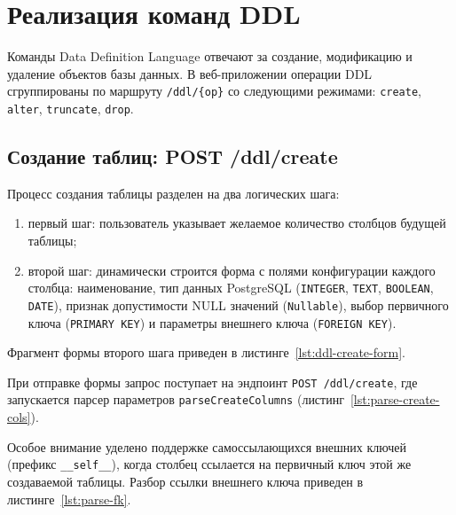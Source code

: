 \section{Реализация команд DDL}
\label{sec:ddl}

Команды Data Definition Language отвечают за создание, модификацию и удаление объектов базы данных. В веб-приложении операции DDL сгруппированы по маршруту \texttt{/ddl/\{op\}} со следующими режимами: \texttt{create}, \texttt{alter}, \texttt{truncate}, \texttt{drop}.

\subsection{Создание таблиц: POST /ddl/create}

Процесс создания таблицы разделен на два логических шага:
\begin{enumerate}
    \item первый шаг: пользователь указывает желаемое количество столбцов будущей таблицы;
    \item второй шаг: динамически строится форма с полями конфигурации каждого столбца: наименование, тип данных PostgreSQL (\texttt{INTEGER}, \texttt{TEXT}, \texttt{BOOLEAN}, \texttt{DATE}), признак допустимости NULL значений (\texttt{Nullable}), выбор первичного ключа (\texttt{PRIMARY KEY}) и параметры внешнего ключа (\texttt{FOREIGN KEY}).
\end{enumerate}

Фрагмент формы второго шага приведен в листинге~\ref{lst:ddl-create-form}.

\begin{listing}[H]
    \caption{Динамическая форма настройки колонок таблицы в \texttt{templates/ddl.html}}
    \label{lst:ddl-create-form}
\end{listing}

При отправке формы запрос поступает на эндпоинт \texttt{POST /ddl/create}, где запускается парсер параметров \texttt{parseCreateColumns} (листинг~\ref{lst:parse-create-cols}).

\begin{listing}[H]
    \caption{Парсинг полей столбцов и первичного ключа в \texttt{handlers\_ddl.go}}
    \label{lst:parse-create-cols}
\end{listing}

Особое внимание уделено поддержке самоссылающихся внешних ключей (префикс \texttt{\_\_self\_\_}), когда столбец ссылается на первичный ключ этой же создаваемой таблицы. Разбор ссылки внешнего ключа приведен в листинге~\ref{lst:parse-fk}.

